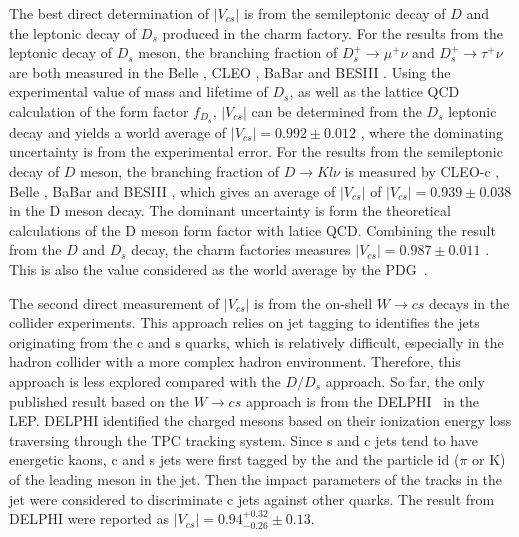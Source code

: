 The best direct determination of $|V_{cs}|$ is from the semileptonic decay of $D$ and the leptonic decay of $D_s$ produced in the charm factory. For the results from the leptonic decay of $D_s$ meson, the branching fraction of $D_s^+ \to \mu^+ \nu$ and $D_s^+ \to \tau^+ \nu$ are both measured in the Belle \cite{Zupanc:2013byn}, CLEO \cite{Alexander:2009ux,Onyisi:2009th,Naik:2009tk}, BaBar \cite{delAmoSanchez:2010jg} and BESIII \cite{Ablikim:2016duz, Ablikim:2018jun}. Using the experimental value of mass and lifetime of $D_s$, as well as the lattice QCD calculation of the form factor $f_{D_s}$, $|V_{cs}|$ can be determined from the $D_s$ leptonic decay and yields a world average of $|V_{cs}|=0.992\pm 0.012$ \cite{Amhis:2019ckw}, where the dominating uncertainty is from the experimental error. For the results from the semileptonic decay of $D$ meson, the branching fraction of $D\to K l\nu$ is measured by CLEO-c \cite{Besson:2009uv}, Belle \cite{Widhalm:2006wz}, BaBar \cite{Aubert:2007wg} and BESIII \cite{Ablikim:2015ixa, Ablikim:2018evp}, which gives an average of $|V_{cs}|$ of $|V_{cs}|=0.939\pm 0.038$ \cite{Amhis:2019ckw} in the D meson decay. The dominant uncertainty is form the theoretical calculations of the D meson form factor with latice QCD. Combining the result from the $D$ and $D_s$ decay, the charm factories measures $|V_{cs}|=0.987\pm 0.011$ \cite{Amhis:2019ckw}. This is also the value considered as the world average by the PDG~\cite{pdg2020}.

The second direct measurement of $|V_{cs}|$ is from the on-shell $W\to c s$ decays in the collider experiments. This approach relies on jet tagging to identifies the jets originating from the c and s quarks, which is relatively difficult, especially in the hadron collider with a more complex hadron environment. Therefore, this approach is less explored compared with the $D/D_s$ approach. So far, the only published result based on the $W\to c s$  approach is from the DELPHI~\cite{Abreu:1998ap} in the LEP. DELPHI identified the charged mesons based on their ionization energy loss traversing through the TPC tracking system. Since s and c jets tend to have energetic kaons, c and s jets were first tagged by the \pt and the particle id ($\pi$ or K) of the leading meson in the jet. Then the impact parameters of the tracks in the jet were considered to discriminate c jets against other quarks. The result from DELPHI were reported as $|V_{cs}|=0.94 ^{+0.32}_{-0.26}\pm 0.13$. 



